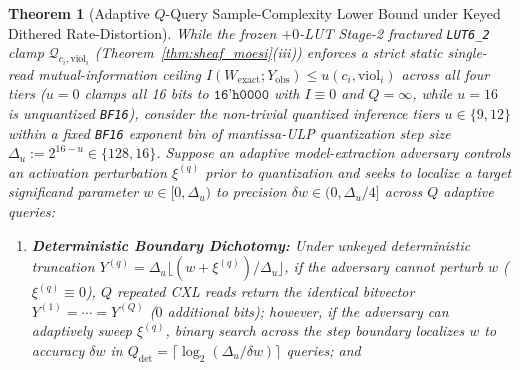 \documentclass[10pt,twocolumn]{article}
\theoremstyle{spectralthm}
\newtheorem{theorem}{Theorem}[section]
\begin{document}
\begin{theorem}[Adaptive $Q$-Query Sample-Complexity Lower Bound under Keyed Dithered Rate-Distortion]
\label{thm:dither_lower_bound}
While the frozen $+0$-LUT Stage-2 fractured \mbox{\texttt{LUT6\_2}} clamp $\mathcal{Q}_{c_i,\mathrm{viol}_i}$ (Theorem~\ref{thm:sheaf_moesi}(iii)) enforces a strict static single-read mutual-information ceiling $I(W_{\mathrm{exact}}; Y_{\mathrm{obs}}) \le u(c_i,\mathrm{viol}_i)$ across all four tiers ($u = 0$ clamps all 16 bits to $\texttt{16'h0000}$ with $I \equiv 0$ and $Q = \infty$, while $u = 16$ is unquantized \texttt{BF16}), consider the non-trivial quantized inference tiers $u \in \{9, 12\}$ within a fixed \texttt{BF16} exponent bin of mantissa-ULP quantization step size $\Delta_u := 2^{16 - u} \in \{128, 16\}$. Suppose an adaptive model-extraction adversary controls an activation perturbation $\xi^{(q)}$ prior to quantization and seeks to localize a target significand parameter $w \in [0, \Delta_u)$ to precision $\delta w \in (0, \Delta_u/4]$ across $Q$ adaptive queries:
\begin{enumerate}
  \item[(i)] \textbf{Deterministic Boundary Dichotomy:} Under unkeyed deterministic truncation $Y^{(q)} = \Delta_u \lfloor (w + \xi^{(q)})/\Delta_u \rfloor$, if the adversary cannot perturb $w$ ($\xi^{(q)} \equiv 0$), $Q$ repeated CXL reads return the identical bitvector $Y^{(1)} = \cdots = Y^{(Q)}$ ($0$ additional bits); however, if the adversary can adaptively sweep $\xi^{(q)}$, binary search across the step boundary localizes $w$ to accuracy $\delta w$ in $Q_{\mathrm{det}} = \lceil \log_2(\Delta_u / \delta w) \rceil$ queries; and

\end{enumerate}
\end{theorem}
\end{document}
